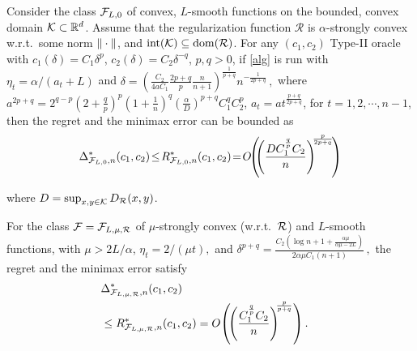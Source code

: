 \begin{theorem}
\label{thm:ub}
Consider the class $\mathcal{F}_{L,0}$ of convex, $L$-smooth functions on the bounded, convex domain $\mathcal{K} \subset \mathbb{R}^d$.
Assume that the regularization function $\mathcal{R}$ is $\alpha$-strongly convex w.r.t.\  some norm $\|\cdot\|$, and $\operatorname{int}(\mathcal{K})\subseteq \operatorname{dom}(\mathcal{R})$.
For any $(c_1,c_2)$ Type-II oracle 
 with $c_1(\delta) = C_1 \delta^p$, $c_2(\delta) = C_2 \delta^{-q}$, $p,q>0$, 
 if \cref{alg} is run with $\eta_t = \alpha/(a_t+L)$ and
 $
 \delta = \left( \tfrac{C_2}{4aC_1}\tfrac{2p+q}{p}\tfrac{n}{n+1}\right)^{\frac{1}{p+q}}n^{-\frac{1}{2p+q}} \,,$  where
 $a^{2p+q} =2^{q-p}\left( 2+\tfrac{q}{p} \right)^p\left(1+ \tfrac{1}{n} \right)^q \left( \tfrac{\alpha}{D} \right)^{p+q}C_1^q C_2^p $,
 $a_t = a t^{\frac{p+q}{2p+q}}$, for $t=1, 2, \cdots, n-1$,
then  the regret and the minimax error %
can be bounded as
 \[
 \Delta_{\F_{L,0},n}^*(c_1,c_2)\!\le \!R_{\F_{L,0},n}^*(c_1,c_2)\!=\! O\!\!\left(\!\!\left(\dfrac{DC_1^{\frac{q}{p}}C_2}{n}\right)^{\!\!\frac{p}{2p+q}}\!\right)
\vspace{-0.3cm}
 \]
 
 where $D=\sup_{x,y\in \mathcal{K}} D_{\mathcal{R}}(x,y)$.
 
For the class $\mathcal{F}=\mathcal{F}_{L,\mu,\mathcal{R}}$ of $\mu$-strongly convex (w.r.t.\  $\mathcal{R}$) and $L$-smooth functions, with $\mu >2L/\alpha$, 
$
 \eta_t = 2/(\mu t),
$ and 
$
\delta^{p+q} =  \tfrac{C_2\left( \log n+1+\tfrac{\alpha \mu}{\alpha \mu -2L}\right)}{2\alpha \mu C_1 (n+1)} \,,
$
the regret and the minimax error satisfy
\begin{align*}
\lefteqn{\Delta_{\F_{L,\mu,\cR},n}^*(c_1,c_2) } \\
& \le  R_{\F_{L,\mu,\cR},n}^*(c_1,c_2) =  O\!\left( \!\left(\dfrac{C_1^{\frac{q}{p}} C_2}{n} \right)^{\!\!\frac{p}{p+q}} \right).
\vspace{-0.5cm}
\end{align*}
\end{theorem}

